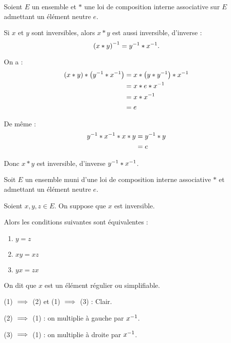 \begin{prop}
Soient \(E\) un ensemble et \(*\) une loi de composition interne associative sur \(E\) admettant un élément neutre \(e\).

Si \(x\) et \(y\) sont inversibles, alors \(x*y\) est aussi inversible, d'inverse : \[\left(x*y\right)^{-1}=y^{-1}*x^{-1}.\]
\end{prop}

\begin{dem}
On a : \[\begin{aligned}
\left(x*y\right)*\left(y^{-1}*x^{-1}\right)&=x*\left(y*y^{-1}\right)*x^{-1} \\
&=x*e*x^{-1} \\
&=x*x^{-1} \\
&=e
\end{aligned}\]

De même : \[\begin{aligned}
y^{-1}*x^{-1}*x*y&=y^{-1}*y \\
&=e
\end{aligned}\]

Donc \(x*y\) est inversible, d'inverse \(y^{-1}*x^{-1}\).
\end{dem}

\begin{prop}
Soit \(E\) un ensemble muni d'une loi de composition interne associative \(*\) et admettant un élément neutre \(e\).

Soient \(x,y,z\in E\). On suppose que \(x\) est inversible.

Alors les conditions suivantes sont équivalentes :

\begin{enumerate}
\item \(y=z\) \\

\item \(xy=xz\) \\

\item \(yx=zx\)
\end{enumerate}

On dit que \(x\) est un élément régulier ou simplifiable.
\end{prop}

\begin{dem}
(1) \(\implies\) (2) et (1) \(\implies\) (3) : Clair.

(2) \(\implies\) (1) : on multiplie à gauche par \(x^{-1}\).

(3) \(\implies\) (1) : on multiplie à droite par \(x^{-1}\).
\end{dem}


